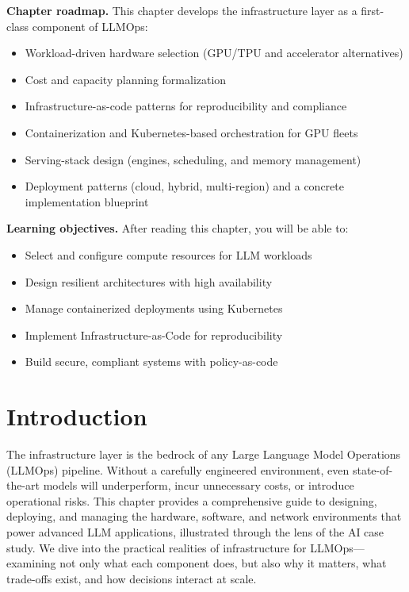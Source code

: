 \begin{tcolorbox}[
  title={\textbf{Chapter Overview}},
  colback=blue!5,
  colframe=blue!40!black,
  colbacktitle=blue!20,
  coltitle=black,
  fonttitle=\bfseries,
  boxrule=0.7pt,
  arc=4pt,
  left=5mm, right=5mm, top=4mm, bottom=4mm,
  breakable
]


\noindent\textbf{Chapter roadmap.}
This chapter develops the infrastructure layer as a first-class component of LLMOps:
\begin{itemize}[leftmargin=1.5em, itemsep=3pt]
    \item Workload-driven hardware selection (GPU/TPU and accelerator alternatives)
    \item Cost and capacity planning formalization
    \item Infrastructure-as-code patterns for reproducibility and compliance
    \item Containerization and Kubernetes-based orchestration for GPU fleets
    \item Serving-stack design (engines, scheduling, and memory management)
    \item Deployment patterns (cloud, hybrid, multi-region) and a concrete \ishtar{} implementation blueprint
\end{itemize}

\medskip
\noindent\textbf{Learning objectives.} After reading this chapter, you will be able to:
\begin{itemize}[leftmargin=1.5em, itemsep=3pt]
    \item Select and configure compute resources for LLM workloads
    \item Design resilient architectures with high availability
    \item Manage containerized deployments using Kubernetes
    \item Implement Infrastructure-as-Code for reproducibility
    \item Build secure, compliant systems with policy-as-code
\end{itemize}
\end{tcolorbox}


\section{Introduction}
\label{sec:ch3-introduction}

The infrastructure layer is the bedrock of any Large Language Model Operations (LLMOps) pipeline.
Without a carefully engineered environment, even state-of-the-art models will underperform, incur unnecessary costs, or introduce operational risks.
This chapter provides a comprehensive guide to designing, deploying, and managing the hardware, software, and network environments that power advanced LLM applications, illustrated through the lens of the \ishtar{} AI case study.
We dive into the practical realities of infrastructure for LLMOps—examining not only what each component does, but also why it matters, what trade-offs exist, and how decisions interact at scale.

